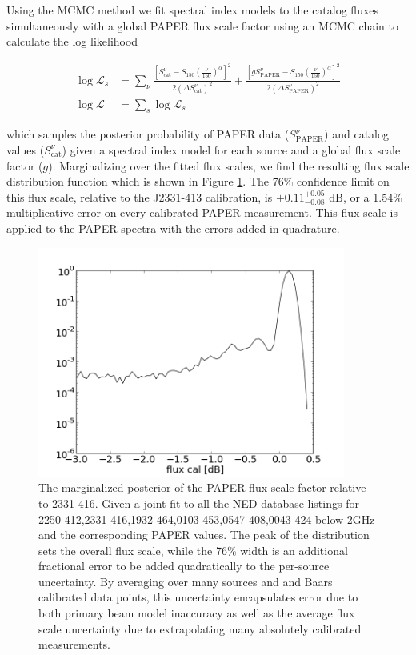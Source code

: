 \documentclass[preprint]{aastex}
\newcommand{\PAPER}{\mathrm{PAPER}}
\begin{document}
Using the MCMC method we fit spectral index models to the catalog fluxes
 simultaneously with a global PAPER flux scale factor using  an MCMC chain to calculate the log likelihood

\begin{align}
\log\mathcal{L}_s &= \sum_{\nu}\frac{ \left[S_\textrm{cat}^{\nu}  - S_{150}  \left(\frac{\nu}{150}\right)^\alpha\right]^2}{2(\Delta S_\textrm{cat}^\nu)^2} +
\frac{ \left[g S_\PAPER^{\nu}  - S_{150}\left(\frac{\nu}{150}\right)^\alpha\right]^2}{2(\Delta S_\PAPER^\nu)^2} \nonumber \\
\log\mathcal{L} &= \sum_{s} \log\mathcal{L}_s
\end{align}


which samples the posterior probability of PAPER data ($S_\PAPER^{\nu}$) and
catalog values ($S_\textrm{cat}^{\nu}$) given a spectral index model for each source and
a global flux scale factor ($g$).
Marginalizing over the fitted flux scales, we find the resulting flux scale distribution function which is shown in Figure
\ref{fig:gain}. The 76\% confidence limit on this flux scale, relative to the
J2331-413 calibration, is  $+0.11 ^{+0.05}_{-0.08}$ dB, or a 1.54\%
multiplicative error on every calibrated PAPER measurement.  This flux scale is applied to the PAPER spectra
with the errors added in quadrature.
\begin{figure}
\centering
\includegraphics[width=0.9\textwidth]{plots/2250-412_2331-416_1932-464_0103-453_0547-408_0043-424_gain_mcmc_chain_gain_conf.png}
\caption{
The marginalized posterior of the PAPER flux scale factor relative to 2331-416. Given a joint fit to all the
 NED database listings for
2250-412,2331-416,1932-464,0103-453,0547-408,0043-424 below 2GHz and the corresponding PAPER values. The peak of the distribution sets the overall flux scale,
while the 76\% width is an additional
 fractional error to be added quadratically to the per-source uncertainty.  
By averaging over many sources and and Baars calibrated data points, this uncertainty encapsulates error due to both primary beam model inaccuracy 
as well as the average flux scale uncertainty due to extrapolating many absolutely calibrated measurements.
\label{fig:gain}}
\end{figure}
\end{document}
